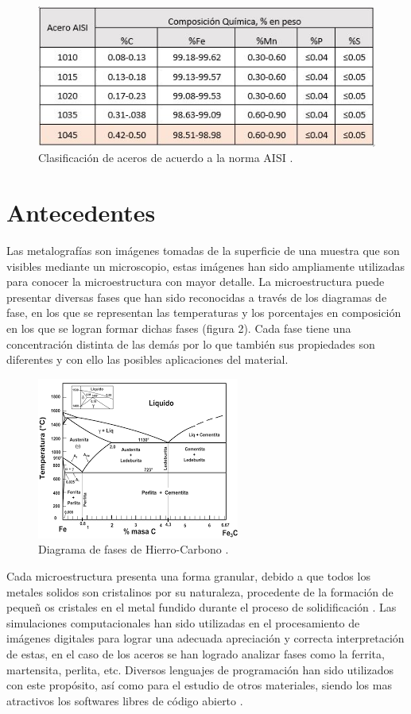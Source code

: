 \documentclass[12pt,twocolumn]{article}
\begin{document}
\begin{figure}[H]
  \centering\includegraphics[scale=0.5]{tablaacero.jpg}
  \caption{Clasificaci\'on de aceros de acuerdo a la norma AISI \cite{ref1}.}
  \label{tab}
\end{figure}

\section{Antecedentes}

Las metalograf\'ias son im\'agenes tomadas de la superficie de una muestra que son visibles mediante un microscopio, estas im\'agenes han sido ampliamente utilizadas para conocer la microestructura con mayor detalle. La microestructura puede presentar diversas fases que han sido reconocidas a trav\'es de los diagramas de fase, en los que se representan las temperaturas y los porcentajes en composici\'on en los que se logran formar dichas fases (figura 2). Cada fase tiene una concentraci\'on distinta de las dem\'as por lo que tambi\'en sus propiedades son diferentes y con ello las posibles aplicaciones del material\cite{ref5}. 

\begin{figure}[H]
  \centering\includegraphics[scale=0.6]{diagramaFeC.png}
  \caption{Diagrama de fases de Hierro-Carbono \cite{ref8}.}
  \label{fig}
\end{figure}

Cada microestructura presenta una forma granular, debido a que todos los metales solidos son cristalinos por su naturaleza, procedente de la formaci\'on de peque\~n os cristales en el metal fundido durante el proceso de solidificaci\'on \cite{ref1}.
Las simulaciones computacionales han sido utilizadas en el procesamiento de im\'agenes digitales para lograr una adecuada apreciaci\'on y correcta interpretaci\'on de estas, en el caso de los aceros se han logrado analizar fases como la ferrita, martensita, perlita, etc. Diversos lenguajes de programaci\'on han sido utilizados con este prop\'osito, as\'i como para el estudio de otros materiales, siendo los mas atractivos los softwares libres de c\'odigo abierto\cite{ref3} \cite{ref4}.
\end{document}
